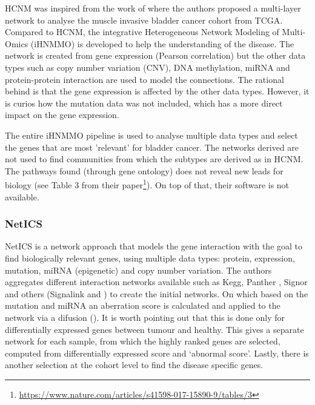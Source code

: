 HCNM was inspired from the work of \citet{Peng2017-ik} where the authors proposed a multi-layer network to analyse the muscle invasive bladder cancer cohort from TCGA. Compared to HCNM, the integrative Heterogeneous Network Modeling of Multi-Omics (iHNMMO) is developed to help the understanding of the disease. The network is created from gene expression (Pearson correlation) but the other data types such as copy number variation (CNV), DNA methylation, miRNA and protein-protein interaction are used to model the connections. The rational behind is that the gene expression is affected by the other data types. However, it is curios how the mutation data was not included, which has a more direct impact on the gene expression.

The entire iHNMMO pipeline is used to analyse multiple data types and select the genes that are most 'relevant' for bladder cancer. The networks derived are not used to find communities from which the subtypes are derived as in HCNM\cite{Vangimalla2021-fc, Care2019-ij}. The pathways found (through gene ontology) does not reveal new leads for biology (see Table 3 from their paper\footnote{\url{https://www.nature.com/articles/s41598-017-15890-9/tables/3}}). On top of that, their software is not available.

\subsubsection{NetICS}

NetICS \citet{Dimitrakopoulos2018-br} is a network approach that models the gene interaction with the goal to find biologically relevant genes, using multiple data types: protein, expression, mutation, miRNA (epigenetic) and copy number variation. The authors aggregates different interaction networks available such as Kegg\cite{Kanehisa2017-wj}, Panther \cite{Thomas2022-kn}, Signor \cite{Perfetto2016-tw} and others (Signalink\cite{Fazekas2013-qh} and \citet{Wu2010-ap}) to create the initial networks. On which based on the mutation and miRNA an aberration score is calculated and applied to the network via a difusion (\cite{Leiserson2015-kv}). It is worth pointing out that this is done only for differentially expressed genes between tumour and healthy. This gives a separate network for each sample, from which the highly ranked genes are selected, computed from differentially expressed score and ‘abnormal score’. Lastly, there is another selection at the cohort level to find the disease specific genes.

